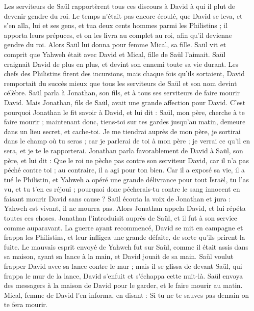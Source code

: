 \begin{multicols}{2}
Les serviteurs de Saül rapportèrent tous ces discours à David à qui il plut de devenir gendre du roi. Le temps n’était pas encore écoulé,
que David se leva, et s'en alla, lui et ses gens, et tua deux cents hommes parmi les Philistins ; il apporta leurs prépuces, et on les livra au complet au roi, afin qu'il devienne gendre du roi. Alors Saül lui donna pour femme Mical, sa fille.
Saül vit et comprit que Yahweh était avec David et Mical, fille de Saül l'aimait.
Saül craignait David de plus en plus, et devint son ennemi toute sa vie durant.
Les chefs des Philistins firent des incursions, mais chaque fois qu’ils sortaient, David remportait du succès mieux que tous les serviteurs de Saül et son nom devint célèbre.
\VerseOne{}Saül parla à Jonathan, son fils, et à tous ses serviteurs de faire mourir David.
Mais Jonathan, fils de Saül, avait une grande affection pour David. C'est pourquoi Jonathan le fit savoir à David, et lui dit : Saül, mon père, cherche à te faire mourir ; maintenant donc, tiens-toi sur tes gardes jusqu'au matin, demeure dans un lieu secret, et cache-toi.
Je me tiendrai auprès de mon père, je sortirai dans le champ où tu seras ; car je parlerai de toi à mon père ; je verrai ce qu'il en sera, et je te le rapporterai.
Jonathan parla favorablement de David à Saül, son père, et lui dit : Que le roi ne pèche pas contre son serviteur David, car il n'a pas péché contre toi ; au contraire, il a agi pour ton bien.
Car il a exposé sa vie, il a tué le Philistin, et Yahweh a opéré une grande délivrance pour tout Israël, tu l'as vu, et tu t'en es réjoui ; pourquoi donc pécherais-tu contre le sang innocent en faisant mourir David sans cause ?
Saül écouta la voix de Jonathan et jura : Yahweh est vivant, il ne mourra pas.
Alors Jonathan appela David, et lui répéta toutes ces choses. Jonathan l’introduisit auprès de Saül, et il fut à son service comme auparavant.
La guerre ayant recommencé, David se mit en campagne et frappa les Philistins, et leur infligea une grande défaite, de sorte qu'ils prirent la fuite.
Le mauvais esprit envoyé de Yahweh fut sur Saül, comme il était assis dans sa maison, ayant sa lance à la main, et David jouait de sa main.
Saül voulut frapper David avec sa lance contre le mur ; mais il se glissa de devant Saül, qui frappa le mur de la lance, David s'enfuit et s'échappa cette nuit-là.
Saül envoya des messagers à la maison de David pour le garder, et le faire mourir au matin. Mical, femme de David l’en informa, en disant : Si tu ne te sauves pas demain on te fera mourir.

\end{multicols}
